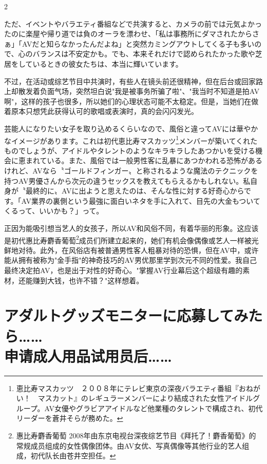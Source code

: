 \documentclass[12pt,UTF8]{ctexbook}
\begin{document}
\begin{paracol}{2}
\switchcolumn*

ただ、イベントやバラエティ番組などで共演すると、カメラの前では元気よかったのに楽屋や帰り道では負のオーラを漂わせ、「私は事務所にダマされたからさぁ」「AVだと知らなかったんだよね」と突然カミングアウトしてくる子も多いので、心のバランスは不安定かも。でも、本来それだけで認められたかった歌や芝居をしているときの彼女たちは、本当に輝いています。

\switchcolumn

不过，在活动或综艺节目中共演时，有些人在镜头前还很精神，但在后台或回家路上却散发着负面气场，突然坦白说"我是被事务所骗了啦"、"我当时不知道是拍AV啊"，这样的孩子也很多，所以她们的心理状态可能不太稳定。但是，当她们在做着原本只想凭此获得认可的歌唱或表演时，真的会闪闪发光。

\switchcolumn*

芸能人になりたい女子を取り込めるくらいなので、風俗と違ってAVには華やかなイメージがあります。これは初代恵比寿マスカッツ\footnote{恵比寿マスカッツ　２００８年にテレビ東京の深夜バラエティ番組『おねがい！　マスカット』のレギュラーメンバーにより結成された女性アイドルグループ。AV女優やグラビアアイドルなど他業種のタレントで構成され、初代リーダーを蒼井そらが務めた。}メンバーが築いてくれたものでしょうが、アイドルやタレントのようなキラキラしたあつかいを受ける機会に恵まれている。また、風俗では一般男性客に乱暴にあつかわれる恐怖があるけれど、AVなら〝ゴールドフィンガー〟と称されるような魔法のテクニックを持つAV男優さんから次元の違うセックスを教えてもらえるかもしれない。私自身が〝最終的に〟AVに出ようと思えたのは、そんな性に対する好奇心からです。「AV業界の裏側という最強に面白いネタを手に入れて、目先の大金もついてくるって、いいかも？」って。

\switchcolumn

正因为能吸引想当艺人的女孩子，所以AV和风俗不同，有着华丽的形象。这应该是初代惠比寿麝香葡萄\footnote{惠比寿麝香葡萄 2008年由东京电视台深夜综艺节目《拜托了！麝香葡萄》的常规成员组成的女性偶像团体。由AV女优、写真偶像等其他行业的艺人组成，初代队长由苍井空担任。}成员们所建立起来的，她们有机会像偶像或艺人一样被光鲜地对待。此外，在风俗店有被普通男性客人粗暴对待的恐惧，但在AV中，或许能从拥有被称为"金手指"的神奇技巧的AV男优那里学到次元不同的性爱。我自己最终决定拍AV，也是出于对性的好奇心。"掌握AV行业幕后这个超级有趣的素材，还能赚到大钱，也许不错？"这样想着。

\end{paracol}

\section{アダルトグッズモニターに応募してみたら……\\申请成人用品试用员后……}
\end{document}
